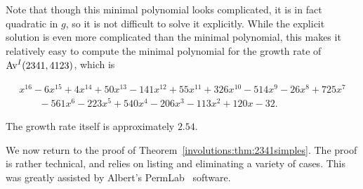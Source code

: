 	
    Note that though this minimal polynomial looks complicated, it is in fact
    quadratic in $g$, so it is not difficult to solve it explicitly. While the
    explicit solution is even more complicated than the minimal polynomial,
    this makes it relatively easy to compute the minimal polynomial for the
    growth rate of $\operatorname{{Av}}^I(2341,4123)$, which is

    \begin{align*}
      x^{16} - 6x^{15} + 4x^{14} + 50x^{13} - 141x^{12} + 55x^{11} + 326x^{10}
      - 514x^9 - 26x^8 + 725x^7\\
      \qquad - 561x^6 - 223x^5 + 540x^4 - 206x^3 - 113x^2 + 120x - 32.
    \end{align*}

    The growth rate itself is approximately $2.54$.





    We now return to the proof of Theorem~\ref{involutions:thm:2341simples}.
    The proof is rather technical, and relies on listing and eliminating a
    variety of cases. This was greatly assisted by Albert's
    PermLab~\cite{PermLab} software. 


